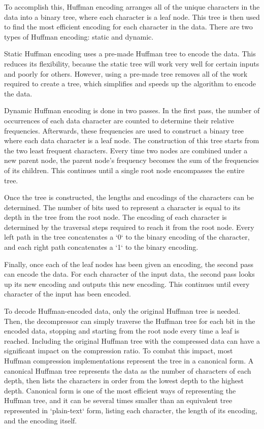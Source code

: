 \documentclass[doublespace,nopageskip]{VTthesis}
\begin{document}
To accomplish this, Huffman encoding arranges all of the unique characters in the data into a binary tree, where each character is a leaf node. This tree is then used to find the most efficient encoding for each character in the data. There are two types of Huffman encoding: static and dynamic.

Static Huffman encoding uses a pre-made Huffman tree to encode the data. This reduces its flexibility, because the static tree will work very well for certain inputs and poorly for others. However, using a pre-made tree removes all of the work required to create a tree, which simplifies and speeds up the algorithm to encode the data.

Dynamic Huffman encoding is done in two passes. In the first pass, the number of occurrences of each data character are counted to determine their relative frequencies. Afterwards, these frequencies are used to construct a binary tree where each data character is a leaf node. The construction of this tree starts from the two least frequent characters. Every time two nodes are combined under a new parent node, the parent node's frequency becomes the sum of the frequencies of its children. This continues until a single root node encompasses the entire tree.

Once the tree is constructed, the lengths and encodings of the characters can be determined. The number of bits used to represent a character is equal to its depth in the tree from the root node. The encoding of each character is determined by the traversal steps required to reach it from the root node. Every left path in the tree concatenates a `0` to the binary encoding of the character, and each right path concatenates a `1` to the binary encoding.

Finally, once each of the leaf nodes has been given an encoding, the second pass can encode the data. For each character of the input data, the second pass looks up its new encoding and outputs this new encoding. This continues until every character of the input has been encoded.

To decode Huffman-encoded data, only the original Huffman tree is needed. Then, the decompressor can simply traverse the Huffman tree for each bit in the encoded data, stopping and starting from the root node every time a leaf is reached. Including the original Huffman tree with the compressed data can have a significant impact on the compression ratio. To combat this impact, most Huffman compression implementations represent the tree in a canonical form. A canonical Huffman tree represents the data as the number of characters of each depth, then lists the characters in order from the lowest depth to the highest depth. Canonical form is one of the most efficient ways of representing the Huffman tree, and it can be several times smaller than an equivalent tree represented in `plain-text` form, listing each character, the length of its encoding, and the encoding itself.
\end{document}
